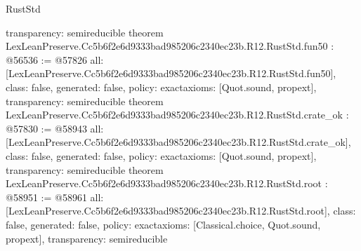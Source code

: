 \begin{lexlean}{RustStd}
\begin{coremodule}
{  transparency: semireducible
}
theorem LexLeanPreserve.Cc5b6f2e6d9333bad985206c2340ec23b.R12.RustStd.fun50 : @56536 := @57826 {
  all: [LexLeanPreserve.Cc5b6f2e6d9333bad985206c2340ec23b.R12.RustStd.fun50],
  class: false,
  generated: false,
  policy: exact{axioms: [Quot.sound, propext]},
  transparency: semireducible
}
theorem LexLeanPreserve.Cc5b6f2e6d9333bad985206c2340ec23b.R12.RustStd.crate_ok : @57830 := @58943 {
  all: [LexLeanPreserve.Cc5b6f2e6d9333bad985206c2340ec23b.R12.RustStd.crate_ok],
  class: false,
  generated: false,
  policy: exact{axioms: [Quot.sound, propext]},
  transparency: semireducible
}
theorem LexLeanPreserve.Cc5b6f2e6d9333bad985206c2340ec23b.R12.RustStd.root : @58951 := @58961 {
  all: [LexLeanPreserve.Cc5b6f2e6d9333bad985206c2340ec23b.R12.RustStd.root],
  class: false,
  generated: false,
  policy: exact{axioms: [Classical.choice, Quot.sound, propext]},
  transparency: semireducible
}


\end{coremodule}
\end{lexlean}
